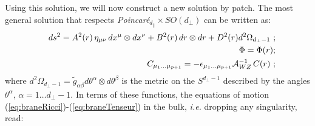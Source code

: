 \documentclass[a4paper,12pt]{article}
\def\dpar{d_{\scriptscriptstyle\parallel}}
\def\dperp{d_{\scriptscriptstyle\perp}}
\begin{document}
Using this solution, we will now construct a new solution by patch.
The most general solution that respects {\it Poincar\'e}$_{\dpar}\times SO(\dperp)$
can be written as:
%
\begin{eqnarray}
&&
ds^2  =
A^2 (r) \, \eta_{\mu\nu}\, dx^\mu \otimes dx^\nu
+ B^2 (r) \, dr \otimes dr
+ D^2 (r) d^2 \Omega_{\dperp-1}   \ ;
\\
&&
\Phi  = \Phi (r) ;
\\
&&
C_{\mu_1\ldots\mu_{p+1}} =
-\epsilon_{\mu_1 \ldots \mu_{p+1}}
{\cal A}_{WZ}^{-1}\,
C (r)\ ;
\end{eqnarray}
%
where $d^2 \Omega_{\dperp-1}={\tilde g}_{\alpha\beta}
d\theta^\alpha \otimes d\theta^\beta$
is the metric on the $S^{\dperp-1}$ described by the angles $\theta^\alpha$,
$\alpha=1\ldots \dperp-1$.
In terms of these functions, the equations of motion
(\ref{eq:braneRicci})-(\ref{eq:braneTenseur}) in the bulk, {\it i.e.} dropping
any singularity, read:
%
%
\end{document}
